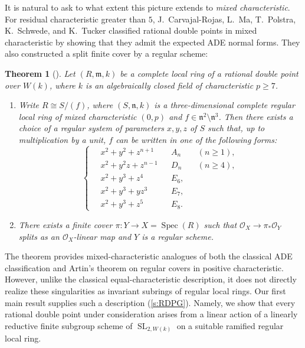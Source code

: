 \documentclass[uplatex,11pt,a4paper]{amsart} %
\numberwithin{equation}{section}
\numberwithin{figure}{section}
\numberwithin{table}{section}
\theoremstyle{plain}
\newtheorem{theorem}{Theorem}[section]
\theoremstyle{definition}
\newcommand{\m}{\mathfrak{m}}
\newcommand{\n}{\mathfrak{n}}
\newcommand{\scrO}{\mathscr{O}}
\DeclareMathOperator{\SL}{SL}
\DeclareMathOperator{\Spec}{Spec}
\begin{document}
It is natural to ask to what extent this picture extends to \emph{mixed characteristic}. For residual characteristic greater than $5$, J.~Carvajal-Rojas, L.~Ma, T.~Polstra, K.~Schwede, and K.~Tucker classified rational double points in mixed characteristic by showing that they admit the expected ADE normal forms. They also constructed a split finite cover by a regular scheme:

\begin{theorem}[{\cite{CRMP+21}}]
\label{thm:CRMP}
Let $(R,\m,k)$ be a complete local ring of a rational double point over $W(k)$, where $k$ is an algebraically closed field of characteristic $p\geq 7$.
  \begin{enumerate}
  \item Write $R\cong S/(f)$, where $(S,\n,k)$ is a three-dimensional complete regular local ring of mixed characteristic $(0,p)$ and $f\in\n^2\setminus\n^3$. Then there exists a choice of a regular system of parameters $x,y,z$ of $S$ such that, up to multiplication by a unit, $f$ can be written in one of the following forms:
\begin{equation}
\left\{ \,
    \begin{aligned}
    & x^2+y^2+z^{n+1} && A_n && (n\geq 1), \\
    & x^2+y^2z+z^{n-1} && D_n && (n\geq 4), \\
    & x^2+y^3+z^4 && E_6, && \\
    & x^2+y^3+yz^3 && E_7, && \\
    & x^2+y^3+z^5 && E_8. &&
    \end{aligned}
\right.
\end{equation}
  \item There exists a finite cover $\pi\colon Y\to X=\Spec(R)$ such that $\scrO_X\to \pi_*\scrO_Y$ splits as an $\scrO_X$-linear map and $Y$ is a regular scheme.
  \end{enumerate}
\end{theorem}

The theorem provides mixed-characteristic analogues of both the classical ADE classification and Artin's theorem on regular covers in positive characteristic. However, unlike the classical equal-characteristic description, it does not directly realize these singularities as invariant subrings of regular local rings. Our first main result supplies such a description (\cref{s:RDPG}). Namely, we show that every rational double point under consideration arises from a linear action of a linearly reductive finite subgroup scheme of $\SL_{2,W(k)}$ on a suitable ramified regular local ring.
\end{document}
